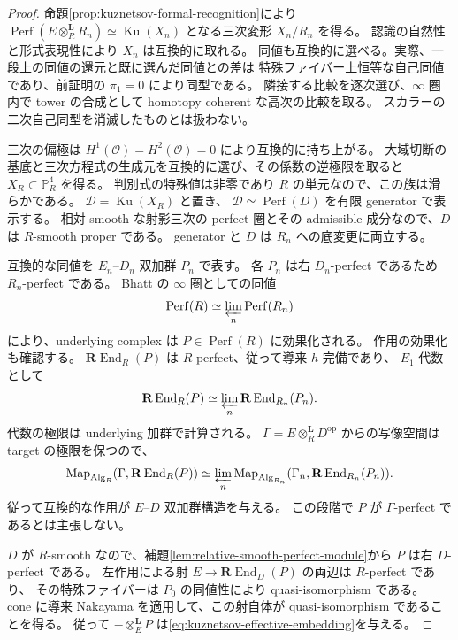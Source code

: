 \begin{proof}
命題\ref{prop:kuznetsov-formal-recognition}により
$\operatorname{Perf}(E\otimes_R^{\mathbf L}R_n)\simeq\operatorname{Ku}(X_n)$
となる三次変形 $X_n/R_n$ を得る。
認識の自然性と形式表現性により $X_n$ は互換的に取れる。
同値も互換的に選べる。実際、一段上の同値の還元と既に選んだ同値との差は
特殊ファイバー上恒等な自己同値であり、前証明の $\pi_1=0$ により同型である。
隣接する比較を逐次選び、$\infty$ 圏内で tower の合成として
homotopy coherent な高次の比較を取る。
スカラーの二次自己同型を消滅したものとは扱わない。

三次の偏極は $H^1(\mathcal O)=H^2(\mathcal O)=0$ により互換的に持ち上がる。
大域切断の基底と三次方程式の生成元を互換的に選び、その係数の逆極限を取ると
$X_R\subset\mathbb P^4_R$ を得る。
判別式の特殊値は非零であり $R$ の単元なので、この族は滑らかである。
$\mathcal D=\operatorname{Ku}(X_R)$ と置き、
$\mathcal D\simeq\operatorname{Perf}(D)$ を有限 generator で表示する。
相対 smooth な射影三次の perfect 圏とその admissible 成分なので、$D$ は $R$-smooth proper である。
generator と $D$ は $R_n$ への底変更に両立する。

互換的な同値を $E_n$--$D_n$ 双加群 $P_n$ で表す。
各 $P_n$ は右 $D_n$-perfect であるため $R_n$-perfect である。
Bhatt \cite[Lemma~4.2]{BhattAlgebraization} の $\infty$ 圏としての同値
\[
 \operatorname{Perf}(R)\simeq\varprojlim_n\operatorname{Perf}(R_n)
\]
により、underlying complex は $P\in\operatorname{Perf}(R)$ に効果化される。
作用の効果化も確認する。
$\mathbf R\operatorname{End}_R(P)$ は $R$-perfect、従って導来 $h$-完備であり、
$E_1$-代数として
\[
 \mathbf R\operatorname{End}_R(P)
 \simeq\varprojlim_n\mathbf R\operatorname{End}_{R_n}(P_n).
\]
代数の極限は underlying 加群で計算される。
$\Gamma=E\otimes_R^{\mathbf L}D^{\mathrm{op}}$ からの写像空間は target の極限を保つので、
\[
 \operatorname{Map}_{\operatorname{Alg}_R}
       (\Gamma,\mathbf R\operatorname{End}_R(P))
 \simeq\varprojlim_n
 \operatorname{Map}_{\operatorname{Alg}_{R_n}}
       (\Gamma_n,\mathbf R\operatorname{End}_{R_n}(P_n)).
\]
従って互換的な作用が $E$--$D$ 双加群構造を与える。
この段階で $P$ が $\Gamma$-perfect であるとは主張しない。

$D$ が $R$-smooth なので、補題\ref{lem:relative-smooth-perfect-module}から
$P$ は右 $D$-perfect である。
左作用による射 $E\to\mathbf R\operatorname{End}_D(P)$ の両辺は $R$-perfect であり、
その特殊ファイバーは $P_0$ の同値性により quasi-isomorphism である。
cone に導来 Nakayama を適用して、この射自体が quasi-isomorphism であることを得る。
従って $-\otimes_E^{\mathbf L}P$ は\eqref{eq:kuznetsov-effective-embedding}を与える。


\end{proof}
